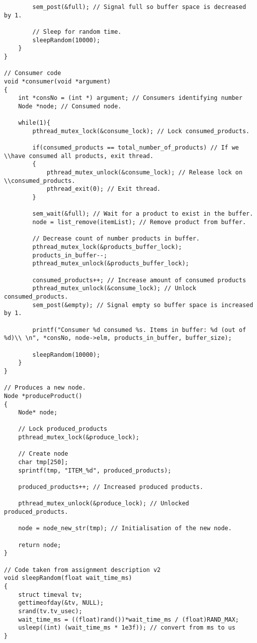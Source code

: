\begin{lstlisting}
		sem_post(&full); // Signal full so buffer space is decreased by 1.
		
		// Sleep for random time.
		sleepRandom(10000);
	}
}

// Consumer code
void *consumer(void *argument)
{
	int *consNo = (int *) argument; // Consumers identifying number
	Node *node; // Consumed node.
	
	while(1){
		pthread_mutex_lock(&consume_lock); // Lock consumed_products.
		
		if(consumed_products == total_number_of_products) // If we \\have consumed all products, exit thread.
		{
			pthread_mutex_unlock(&consume_lock); // Release lock on \\consumed_products.
			pthread_exit(0); // Exit thread.
		}
		
		sem_wait(&full); // Wait for a product to exist in the buffer.
		node = list_remove(itemList); // Remove product from buffer.

		// Decrease count of number products in buffer.
		pthread_mutex_lock(&products_buffer_lock);
		products_in_buffer--;
		pthread_mutex_unlock(&products_buffer_lock);
		
		consumed_products++; // Increase amount of consumed products
		pthread_mutex_unlock(&consume_lock); // Unlock consumed_products.
		sem_post(&empty); // Signal empty so buffer space is increased by 1.

		printf("Consumer %d consumed %s. Items in buffer: %d (out of %d)\\ \n", *consNo, node->elm, products_in_buffer, buffer_size);
		
		sleepRandom(10000);
	}
}

// Produces a new node.
Node *produceProduct()
{
	Node* node;
	
	// Lock produced_products
	pthread_mutex_lock(&produce_lock);

	// Create node
	char tmp[250];
	sprintf(tmp, "ITEM_%d", produced_products);
	
	produced_products++; // Increased produced products.

	pthread_mutex_unlock(&produce_lock); // Unlocked produced_products.
	
	node = node_new_str(tmp); // Initialisation of the new node.
	
	return node;
}

// Code taken from assignment description v2
void sleepRandom(float wait_time_ms)
{
	struct timeval tv;
	gettimeofday(&tv, NULL);
	srand(tv.tv_usec);
	wait_time_ms = ((float)rand())*wait_time_ms / (float)RAND_MAX;
	usleep((int) (wait_time_ms * 1e3f)); // convert from ms to us
}
\end{lstlisting}